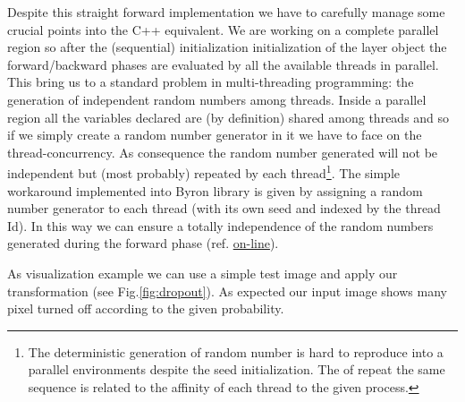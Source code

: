 \documentclass{standalone}
\begin{document}
Despite this straight forward implementation we have to carefully manage some crucial points into the C++ equivalent.
We are working on a complete parallel region so after the (sequential) initialization initialization of the layer object the forward/backward phases are evaluated by all the available threads in parallel.
This bring us to a standard problem in multi-threading programming: the generation of independent random numbers among threads.
Inside a parallel region all the variables declared are (by definition) shared among threads and so if we simply create a random number generator in it we have to face on the thread-concurrency.
As consequence the random number generated will not be independent but (most probably) repeated by each thread\footnote{
  The deterministic generation of random number is hard to reproduce into a parallel environments despite the seed initialization.
  The  of repeat the same sequence is related to the affinity of each thread to the given process.
}.
The simple workaround implemented into Byron library is given by assigning a random number generator to each thread (with its own seed and indexed by the thread Id).
In this way we can ensure a totally independence of the random numbers generated during the forward phase (ref. \href{https://github.com/Nico-Curti/Byron/blob/master/src/dropout_layer.cpp}{on-line}).


As visualization example we can use a simple test image and apply our transformation (see Fig.\ref{fig:dropout}).
As expected our input image shows many pixel turned off according to the given probability.
\end{document}
